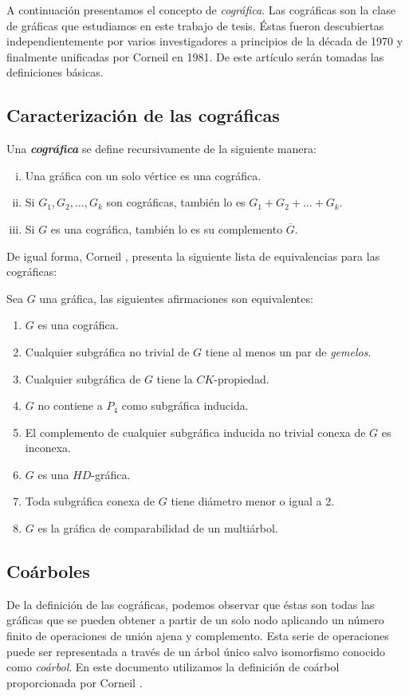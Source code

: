A continuación presentamos el concepto de \emph{cográfica}. Las cográficas son la clase de gráficas que estudiamos en este trabajo de tesis. Éstas fueron descubiertas independientemente por varios investigadores a principios de la década de 1970 y finalmente unificadas por Corneil en 1981\cite{Corneil}. De este artículo serán tomadas las definiciones básicas. 

\subsection{Caracterización de las cográficas}

Una \emph{\textbf{cográfica}} se define recursivamente de la siguiente manera:

\begin{enumerate}[(i)]
    \item Una gráfica con un solo vértice es una cográfica.
    \item Si $G_1, G_2, \dots, G_k$ son cográficas, también lo es $G_1 + G_2 + \dots + G_k$.
    \item Si $G$ es una cográfica, también lo es su complemento $\overline{G}$.
\end{enumerate}

De igual forma, Corneil \cite{Corneil}, presenta la siguiente lista de equivalencias para las cográficas:

Sea $G$ una gráfica, las siguientes afirmaciones son equivalentes:

\begin{enumerate}[(1)]
    \item $G$ es una cográfica.
    \item Cualquier subgráfica no trivial de $G$ tiene al menos un par de \emph{gemelos}.
    \item Cualquier subgráfica de $G$ tiene la $CK$-propiedad.
    \item $G$ no contiene a $P_4$ como subgráfica inducida.
    \item El complemento de cualquier subgráfica inducida no trivial conexa de $G$ es inconexa.
    \item $G$ es una $HD$-gráfica.
    \item Toda subgráfica conexa de $G$ tiene diámetro menor o igual a 2.
    \item $G$ es la gráfica de comparabilidad de un multiárbol.
\end{enumerate}

\subsection{Coárboles}
 De la definición de las cográficas, podemos observar que éstas son todas las gráficas que se pueden obtener a partir de un solo nodo aplicando un número finito de operaciones de unión ajena y complemento. Esta serie de operaciones puede ser representada a través de un árbol único salvo isomorfismo conocido como \emph{coárbol}. En este documento utilizamos la definición de coárbol proporcionada por Corneil \cite{Corneil02}.
 
